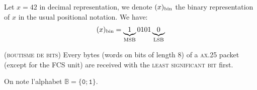 \documentclass[twocolumn,pre,floats,aps,amsmath,amssymb]{revtex4}
\newenvironment{example}[1][Exemple.]{\begin{trivlist}
\item[\hskip \labelsep {\bfseries #1}]}{\end{trivlist}}
\newenvironment{remark}[1][Remarque.]{\begin{trivlist}
\item[\hskip \labelsep {\bfseries #1}]}{\end{trivlist}}
\begin{document}
\begin{example}
  Let $x = 42$ in decimal representation, we denote $(x)_{\textup{bin}}$ the binary representation of $x$ in the usual positional notation. We have:
  \begin{eqnarray*}
    (x)_{\textup{bin}} = \underbrace{1}_{\textup{MSB}}0101\underbrace{0}_{\textup{LSB}}
  \end{eqnarray*}

\end{example}

\begin{remark}
  (\textsc{boutisme de bits})
  Every bytes (words on bits of length $8$) of a \textsc{ax.25} packet (except for the FCS unit) are received with the \textsc{least significant bit} first\cite{IITB}.
\end{remark}

On note l'alphabet $\mathbb{B} = \{\texttt{0} ; \texttt{1}\}$.
\end{document}
